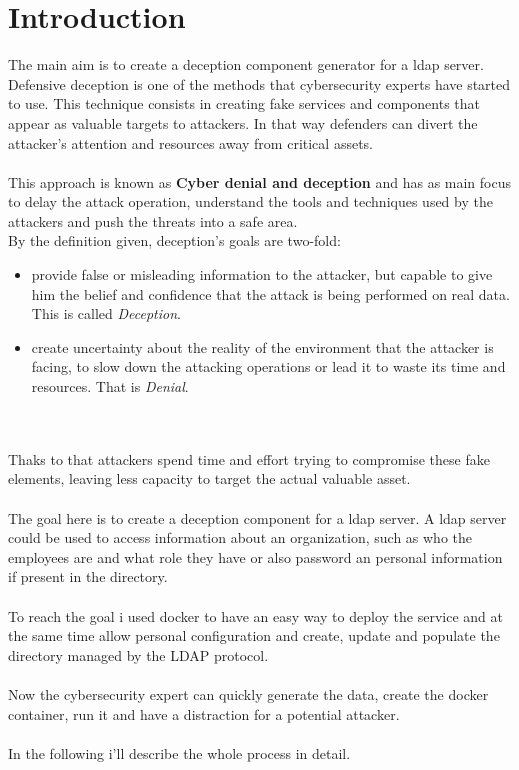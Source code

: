 \chapter*{Introduction}
The main aim is to create a deception component generator for a ldap server. Defensive deception is one of the methods that cybersecurity experts have started to use. This technique consists in creating fake services and components that appear as valuable targets to attackers.
In that way defenders can divert the attacker’s attention and resources away from critical assets.\\\\
This approach is known as \textbf{Cyber denial and deception} and has as main focus to delay the attack operation, understand the tools and techniques used by the attackers and push the threats into a safe area.\\
By the definition given, deception's goals are two-fold:
\begin{itemize}
    \item provide false or misleading information to the attacker, but capable to give him the belief and confidence that the attack is being performed on real data. This is called \emph{Deception}.
    \item create uncertainty about the reality of the environment that the attacker is facing, to slow down the attacking operations or lead it to waste its time and resources. That is \emph{Denial}.
\end{itemize}
\\\\
Thaks to that attackers spend time and effort trying to compromise these fake elements, leaving less capacity to target the actual valuable asset. 
\\\\
The goal here is to create a deception component for a ldap server. A ldap server could be used to access information about an organization, such as who the employees are and what role they have or also password an personal information if present in the directory. 
\\\\
To reach the goal i used docker to have an easy way to deploy the service and at the same time allow personal configuration and create, update and populate the directory managed by the LDAP protocol. 
\\\\
Now the cybersecurity expert can quickly generate the data, create the docker container, run it and have a distraction for a potential attacker. 
\\\\
In the following i'll describe the whole process in detail.


